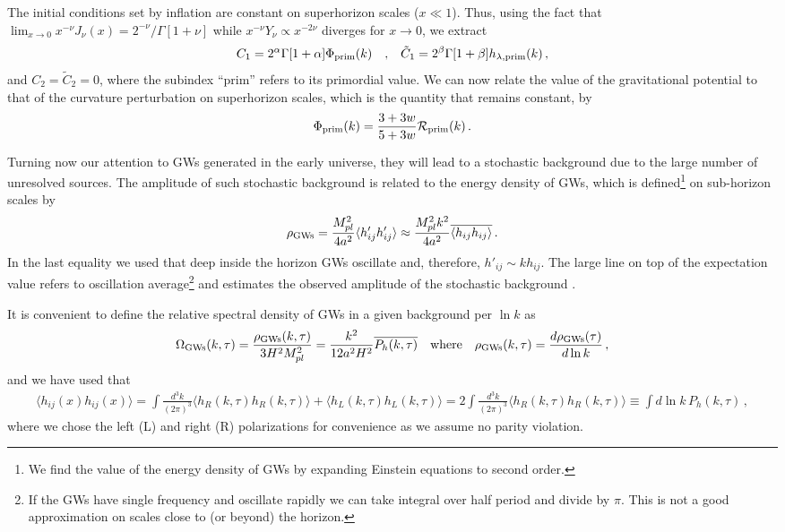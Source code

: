 \documentclass[aps,10pt,prd,groupedaddress,nofootinbib,notitlepage,eqsecnum,preprintnumbers]{revtex4-1}
\begin{document}
The initial conditions set by inflation are constant on superhorizon scales ($x\ll1$). Thus, using the fact that $\lim_{x\to 0}x^{-\nu}{J_\nu(x)}={2^{-\nu}}/{\Gamma[1+\nu]}$
while $x^{-\nu}Y_\nu\propto x^{-2\nu}$ diverges for $x\to 0$, we extract
\begin{align}
C_1=2^\alpha\Gamma[1+\alpha]\Phi_{\rm prim}(k) \quad{,}\quad \tilde C_1=2^\beta\Gamma[1+\beta]h_{\lambda,{\rm prim}}(k)\,,
\end{align}
and $C_2=\tilde C_2=0$, where the subindex ``prim'' refers to its primordial value. We can now relate the value of the gravitational potential to that of the curvature perturbation on superhorizon scales, which is the quantity that remains constant, by \cite{Kodama:1985bj,Mukhanov:1990me,Kohri:2018awv}
\begin{align}
\Phi_{\rm prim}(k)=\frac{3+3w}{5+3w}{\cal R}_{{\rm prim}}(k)\,.
\end{align}

Turning now our attention to GWs generated in the early universe, they will lead to a stochastic background due to the large number of unresolved sources. The amplitude of such stochastic background is related to the energy density of GWs, which is defined\footnote{We find the value of the energy density of GWs by expanding Einstein equations to second order.} on sub-horizon scales by \cite{Maggiore:1900zz,Watanabe:2006qe}
\begin{align}
\rho_{\rm GWs}=\frac{M_{pl}^2}{4a^2}\langle h'_{ij}h'_{ij}\rangle\approx\frac{M_{pl}^2k^2}{4a^2}\overline{\langle h_{ij}h_{ij}\rangle}\,.\nonumber
\end{align}
In the last equality we used that deep inside the horizon GWs oscillate and, therefore, $h'_{ij}\sim k h_{ij}$. The large line on top of the expectation value refers to oscillation average\footnote{If the GWs have single frequency and oscillate rapidly we can take integral over half period and divide by $\pi$. This is not a good approximation on scales close to (or beyond) the horizon.} and estimates the observed amplitude of the stochastic background \cite{Maggiore:1900zz,Kohri:2018awv}.

It is convenient to define the relative spectral density of GWs in a given background per $\ln k$ as
\begin{align}\label{eq:spectraldensity}
\Omega_{\rm GWs}(k,\tau)=\frac{\rho_{\rm GWs}(k,\tau)}{3H^2M_{pl}^2}=\frac{k^2}{12a^2H^2}\overline{P_h(k,\tau)}
\quad{\rm where}\quad
\rho_{\rm GWs}(k,\tau)=\frac{d\rho_{\rm GWs}(\tau)}{d\ln k}\,,
\end{align}
and we have used that
\begin{align}
\langle h_{ij}(x) h_{ij}(x)\rangle=\int \frac{d^3k}{(2\pi)^3} \langle h_R(k,\tau)h_R(k,\tau)\rangle+\langle h_L(k,\tau)h_L(k,\tau)\rangle=2\int \frac{d^3k}{(2\pi)^3} \langle h_R(k,\tau)h_R(k,\tau)\rangle\equiv\int d\ln k \,P_h(k,\tau)\,,
\end{align}
where we chose the left (L) and right (R) polarizations for convenience as we assume no parity violation.
\end{document}
